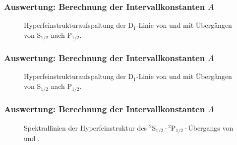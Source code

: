 \begin{frame}
\frametitle{Auswertung: Berechnung der Intervallkonstanten $A$}
\begin{figure}
    \centering
    \def\svgwidth{\textwidth}
    
    \caption{Hyperfeinstrukturaufspaltung der D$_1$-Linie von 
     und  mit Übergängen von S$_{1/2}$ nach P$_{1/2}.$}
\end{figure}
\end{frame}


\begin{frame}
\frametitle{Auswertung: Berechnung der Intervallkonstanten $A$}
\begin{figure}
    \centering
    \def\svgwidth{\textwidth}
    
    \caption{Hyperfeinstrukturaufspaltung der D$_1$-Linie von 
     und  mit Übergängen von S$_{1/2}$ nach P$_{1/2}.$}
\end{figure}
\end{frame}


\begin{frame}
\frametitle{Auswertung: Berechnung der Intervallkonstanten $A$}

\begin{figure}
    \centering
    \def\svgwidth{\textwidth}
    
    \caption{Spektrallinien der Hyperfeinstruktur des ${}^2\text{S}_{1/2}$\,-\,${}^2\text{P}_{1/2}$\,-\,Übergangs
    von  und .}
\end{figure}

\end{frame}


